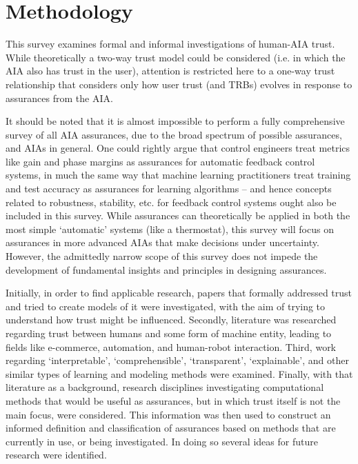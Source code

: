 \section{Methodology} \label{sec:methodology}
    This survey examines formal and informal investigations of human-AIA trust. While theoretically a two-way trust model could be considered (i.e. in which the AIA also has trust in the user), attention is restricted here to a one-way trust relationship that considers only how user trust (and TRBs) evolves in response to assurances from the AIA. 

    It should be noted that it is almost impossible to perform a fully comprehensive survey of all AIA assurances, due to the broad spectrum of possible assurances, and AIAs in general. One could rightly argue that control engineers treat metrics like gain and phase margins as assurances for automatic feedback control systems, in much the same way that  machine learning practitioners treat training and test accuracy as assurances for learning algorithms -- and hence concepts related to robustness, stability, etc. for feedback control systems ought also be included in this survey. While assurances can theoretically be applied in both the most simple `automatic' systems (like a thermostat), this survey will focus on assurances in more advanced AIAs that make decisions under uncertainty. However, the admittedly narrow scope of this survey does not impede the development of fundamental insights and principles in designing assurances.

    Initially, in order to find applicable research, papers that formally addressed trust and tried to create models of it were investigated, with the aim of trying to understand how trust might be influenced. Secondly, literature was researched regarding trust between humans and some form of machine entity, leading to fields like e-commerce, automation, and human-robot interaction. Third, work regarding `interpretable', `comprehensible', `transparent', `explainable', and other similar types of learning and modeling methods were examined. Finally, with that literature as a background, research disciplines investigating computational methods that would be useful as assurances, but in which trust itself is not the main focus, were considered. This information was then used to construct an informed definition and classification of assurances based on methods that are currently in use, or being investigated. In doing so several ideas for future research were identified.
